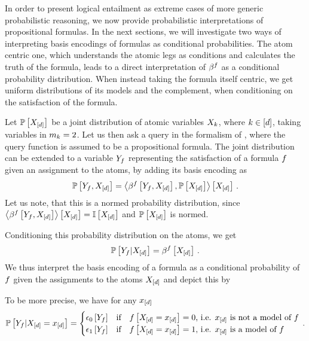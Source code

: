 In order to present logical entailment as extreme cases of more generic probabilistic reasoning, we now provide probabilistic interpretations of propositional formulas.
In the next sections, we will investigate two ways of interpreting basis encodings of formulas as conditional probabilities.
The atom centric one, which understands the atomic legs as conditions and calculates the truth of the formula, leads to a direct interpretation of $\beta^{f}$ as a conditional probability distribution.
When instead taking the formula itself centric, we get uniform distributions of its models and the complement, when conditioning on the satisfaction of the formula.


Let $\mathbb{P}\left[X_{[d]}\right]$ be a joint distribution of atomic variables $X_{k}$, where $k\in[d]$, taking variables in $m_{k}=2$.
Let us then ask a query in the formalism of , where the query function is assumed to be a propositional formula.
The joint distribution can be extended to a variable $Y_{f}$ representing the satisfaction of a formula $f$ given an assignment to the atoms, by adding its basis encoding as
\begin{align*}
    \mathbb{P}\left[Y_{f},X_{[d]}\right]
    = \left\langle \beta^{f}\left[Y_{f},X_{[d]}\right],\mathbb{P}\left[X_{[d]}\right]\right\rangle \left[ X_{[d]} \right] \, .
\end{align*}
Let us note, that this is a normed probability distribution, since $\left\langle \beta^{f}\left[Y_{f},X_{[d]}\right]\right\rangle \left[ X_{[d]} \right]=\mathbb{I}\left[X_{[d]}\right]$ and $\mathbb{P}\left[X_{[d]}\right]$ is normed.

Conditioning this probability distribution on the atoms, we get
\begin{align*}
    \mathbb{P}\left[Y_{f}|X_{[d]}\right]
    = \beta^{f}\left[X_{[d]}\right] \, .
\end{align*}
We thus interpret the basis encoding of a formula as a conditional probability of $f$ given the assignments to the atoms $X_{[d]}$ and depict this by
\begin{center}
    
\end{center}
To be more precise, we have for any $x_{[d]}$
\begin{align*}
    \mathbb{P}\left[Y_{f}|X_{[d]}=x_{[d]}\right] =
    \begin{cases}
        \epsilon_0\left[Y_{f}\right] & \text{if} \quad f\left[X_{[d]}=x_{[d]}\right] = 0 \text{, i.e. $x_{[d]}$ is not a model of $f$} \\
        \epsilon_1\left[Y_{f}\right] & \text{if} \quad f\left[X_{[d]}=x_{[d]}\right] = 1 \text{, i.e. $x_{[d]}$ is a model of $f$}
    \end{cases} \, .
\end{align*}

